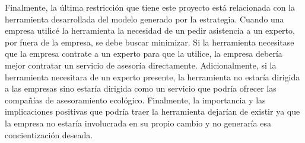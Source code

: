 \hfill

Finalmente, la última restricción que tiene este proyecto está relacionada con la herramienta desarrollada del modelo generado por la estrategia. Cuando una empresa utilicé la herramienta la necesidad de un pedir asistencia a un experto, por fuera de la empresa, se debe buscar minimizar. Si la herramienta necesitase que la empresa contrate a un experto para que la utilice, la empresa debería mejor contratar un servicio de asesoría directamente. Adicionalmente, si la herramienta necesitara de un experto presente, la herramienta no estaría dirigida a las empresas sino estaría dirigida como un servicio que podría ofrecer las compañías de asesoramiento ecológico. Finalmente, la importancia y las implicaciones positivas que podría traer la herramienta dejarían de existir ya que la empresa no estaría involucrada en su propio cambio y no generaría esa concientización deseada.